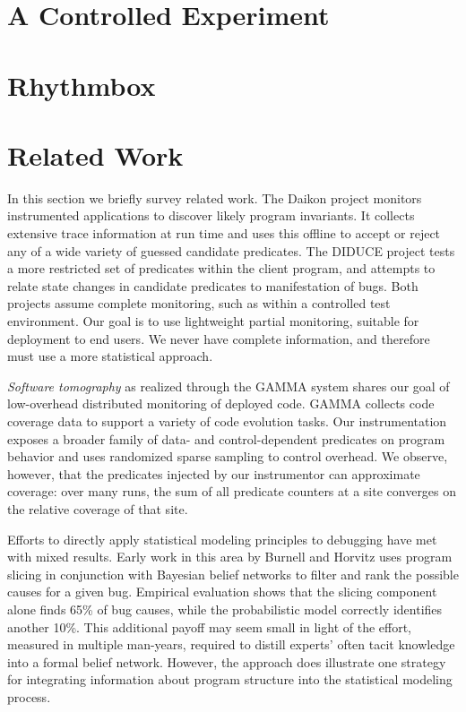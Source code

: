 \documentclass{sig-alternate}
\newcommand{\termdef}[1]{\textit{#1}}
\begin{document}
\section{A Controlled Experiment}
\label{sec:experiments:results}



\section{Rhythmbox}
\label{sec:rb}

\section{Related Work}
\label{sec:related-work}

In this section we briefly survey related work.
The Daikon project \cite{ernst2001} monitors instrumented applications
to discover likely program invariants.  It collects extensive trace
information at run time and uses this offline to accept or reject any
of a wide variety of guessed candidate predicates.  The DIDUCE project
\cite{ICSE02*291} tests a more restricted set of predicates within the
client program, and attempts to relate state changes in candidate
predicates to manifestation of bugs.  Both projects assume complete
monitoring, such as within a controlled test environment.  Our goal is
to use lightweight partial monitoring, suitable for deployment to end
users.  We never have complete information, and therefore must use a
more statistical approach.

\termdef{Software tomography} as realized through the GAMMA system
\cite{PASTE'02*2,Orso:2003:LFDIART} shares our goal of low-overhead
distributed monitoring of deployed code.  GAMMA collects code coverage
data to support a variety of code evolution tasks.  Our
instrumentation exposes a broader family of data- and
control-dependent predicates on program behavior and uses randomized
sparse sampling to control overhead.  We observe, however, that the
predicates injected by our instrumentor can approximate coverage: over
many runs, the sum of all predicate counters at a site converges on
the relative coverage of that site.

Efforts to directly apply statistical modeling principles to debugging
have met with mixed results.  Early work in this area by Burnell and
Horvitz \cite{Burnell:1995:SCM} uses program slicing in conjunction
with Bayesian belief networks to filter and rank the possible causes
for a given bug.  Empirical evaluation shows that the slicing component
alone finds 65\% of bug causes, while the probabilistic model
correctly identifies another 10\%.  This additional payoff may seem
small in light of the effort, measured in multiple
man-years, required to distill experts' often tacit knowledge into a
formal belief network.  However, the approach does illustrate one
strategy for integrating information about program structure into the
statistical modeling process.
\end{document}
